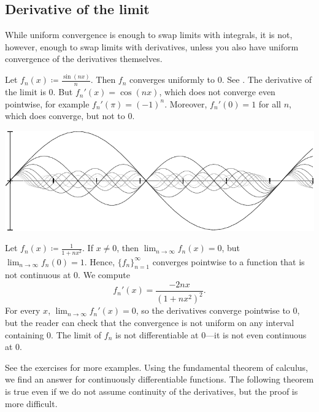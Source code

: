 \subsection{Derivative of the limit}

While uniform convergence is enough to swap limits with integrals, it is not,
however, enough to swap limits with derivatives, unless you also have
uniform convergence of the derivatives themselves.

\begin{example}
Let $f_n(x) \coloneqq \frac{\sin(nx)}{n}$.  Then $f_n$ converges uniformly to
0.  See .
The derivative of the limit is 0.  But $f_n'(x) = \cos(nx)$, which
does not converge even pointwise, for
example $f_n'(\pi) = {(-1)}^n$.  Moreover,
$f_n'(0) = 1$ for all $n$, which does converge, but not to $0$.
\begin{myfigureht}
\includegraphics{figures/conv1nsinxn}
\caption{Graphs of $\frac{\sin(nx)}{n}$ for
$n=1,2,\ldots,10$, with higher $n$ in lighter gray.%
\label{fig:conv1nsinxn}}
\end{myfigureht}
\end{example}

\begin{example} \label{exercise:badconvergenceder}
Let $f_n(x) \coloneqq \frac{1}{1+nx^2}$.
If $x \not= 0$, then $\lim_{n \to \infty} f_n(x) = 0$,
but $\lim_{n \to \infty} f_n(0) = 1$.
Hence, $\{ f_n \}_{n=1}^\infty$ converges pointwise to a function that is not continuous
at $0$.
We compute
\begin{equation*}
f_n'(x) %
= \frac{-2 n x}{(1+ n x^2)^2} .
\end{equation*}
For every $x$, $\lim_{n\to\infty} f_n'(x) = 0$, so the derivatives
converge pointwise to 0,
but the reader can check that the convergence is not uniform on any
interval containing $0$.
The limit of $f_n$ is not differentiable at $0$---it is not even
continuous at $0$.
\end{example}

See the exercises for more examples.  Using 
the fundamental theorem of calculus, we find an answer for continuously
differentiable functions.  The following theorem is true even if 
we do not assume continuity of the derivatives, but the proof is more
difficult.

